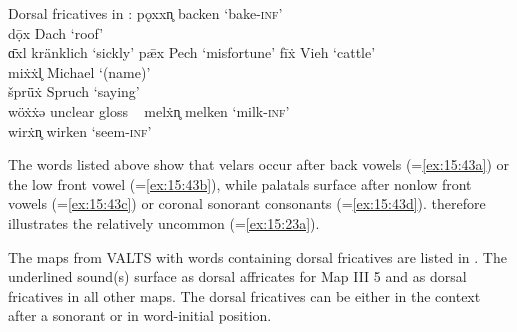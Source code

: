 \ea%
\label{ex:15:43}Dorsal fricatives in :
\ea\label{ex:15:43a}  pǫxxn̥ \tab [pɔxxn] \tab backen \tab ‘bake\textsc{{}-inf}’ \\
     dọ̄x  \tab  [dɔːx] \tab Dach \tab ‘roof’ \\
     ɑ̄xl  \tab  [ɑːxl] \tab kränklich \tab ‘sickly’ 
\ex\label{ex:15:43b}  p\={æ}x \tab [pæːx] \tab Pech \tab ‘misfortune’ 
\ex\label{ex:15:43c}  fī\.{x}  \tab  [fiːç] \tab Vieh \tab ‘cattle’ \\
     mi\.{x}\.{x}l̥ \tab [miççl] \tab Michael \tab ‘(name)’ \\
     šprǖ\.{x} \tab [ʃpryːç] \tab Spruch \tab ‘saying’ \\
     wö\.{x}\.{x}ə \tab [wøççə] \tab unclear gloss  \tab ~ 
\ex\label{ex:15:43d}  mel\.{x}n̥ \tab [melçn] \tab melken \tab ‘milk\textsc{{}-inf}’ \\
     wir\.{x}n̥ \tab [wirçn] \tab wirken \tab ‘seem\textsc{{}-inf}’ 
\z 
\z 

The words listed above show that velars occur after back vowels (=\ref{ex:15:43a}) or the low front vowel (=\ref{ex:15:43b}), while palatals surface after nonlow front vowels (=\ref{ex:15:43c}) or coronal sonorant consonants (=\ref{ex:15:43d}).  therefore illustrates the relatively uncommon  (=\ref{ex:15:23a}).

The maps from VALTS with words containing dorsal fricatives are listed in . The underlined sound(s) surface as dorsal affricates for Map III 5 and as dorsal fricatives in all other maps. The dorsal fricatives can be either in the context after a sonorant or in word-initial position.

